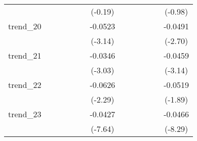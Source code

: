 {\begin{tabular}{l*{12}{c}}
            &                     &                     &                     &                     &                     &     (-0.19)         &                     &                     &                     &                     &                     &     (-0.98)         \\
[1em]
trend\_20    &                     &                     &                     &                     &                     &     -0.0523\sym{**} &                     &                     &                     &                     &                     &     -0.0491\sym{**} \\
            &                     &                     &                     &                     &                     &     (-3.14)         &                     &                     &                     &                     &                     &     (-2.70)         \\
[1em]
trend\_21    &                     &                     &                     &                     &                     &     -0.0346\sym{**} &                     &                     &                     &                     &                     &     -0.0459\sym{**} \\
            &                     &                     &                     &                     &                     &     (-3.03)         &                     &                     &                     &                     &                     &     (-3.14)         \\
[1em]
trend\_22    &                     &                     &                     &                     &                     &     -0.0626\sym{*}  &                     &                     &                     &                     &                     &     -0.0519         \\
            &                     &                     &                     &                     &                     &     (-2.29)         &                     &                     &                     &                     &                     &     (-1.89)         \\
[1em]
trend\_23    &                     &                     &                     &                     &                     &     -0.0427\sym{***}&                     &                     &                     &                     &                     &     -0.0466\sym{***}\\
            &                     &                     &                     &                     &                     &     (-7.64)         &                     &                     &                     &                     &                     &     (-8.29)         \\

\end{tabular}}
